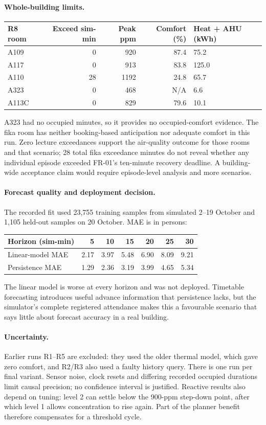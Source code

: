 \documentclass[11pt,a4paper]{article}
\begin{document}
\paragraph{Whole-building limits.}\mbox{}\par
\noindent\begin{tabularx}{\linewidth}{lrrrX}\toprule R8 room & Exceed sim-min & Peak ppm & Comfort (\%) & Heat + AHU (kWh)\\\midrule
A109 & 0 & 920 & 87.4 & 75.2\\
A117 & 0 & 913 & 83.8 & 125.0\\
A110 & 28 & 1192 & 24.8 & 65.7\\
A323 & 0 & 468 & N/A & 6.6\\
A113C & 0 & 829 & 79.6 & 10.1\\\bottomrule\end{tabularx}
A323 had no occupied minutes, so it provides no occupied-comfort evidence. The fika room has neither booking-based anticipation nor adequate comfort in this run. Zero lecture exceedances support the air-quality outcome for those rooms and that scenario; 28 total fika exceedance minutes do not reveal whether any individual episode exceeded FR-01's ten-minute recovery deadline. A building-wide acceptance claim would require episode-level analysis and more scenarios.

\paragraph{Forecast quality and deployment decision.}
The recorded fit used 23,755 training samples from simulated 2--19 October and 1,105 held-out samples on 20 October. MAE is in persons:
\noindent\begin{tabularx}{\linewidth}{Xrrrrrr}\toprule Horizon (sim-min) & 5 & 10 & 15 & 20 & 25 & 30\\\midrule
Linear-model MAE & 2.17 & 3.97 & 5.48 & 6.90 & 8.09 & 9.21\\
Persistence MAE & 1.29 & 2.36 & 3.19 & 3.99 & 4.65 & 5.34\\\bottomrule\end{tabularx}
The linear model is worse at every horizon and was not deployed. Timetable forecasting introduces useful advance information that persistence lacks, but the simulator's complete registered attendance makes this a favourable scenario that says little about forecast accuracy in a real building.

\paragraph{Uncertainty.}
Earlier runs R1--R5 are excluded: they used the older thermal model, which gave zero comfort, and R2/R3 also used a faulty history query. There is one run per final variant. Sensor noise, clock resets and differing recorded occupied durations limit causal precision; no confidence interval is justified. Reactive results also depend on tuning: level 2 can settle below the 900-ppm step-down point, after which level 1 allows concentration to rise again. Part of the planner benefit therefore compensates for a threshold cycle.
\end{document}
